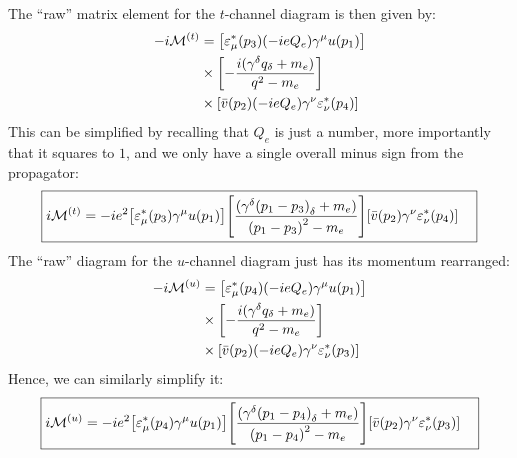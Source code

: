 \documentclass[12pt]{article}
\newcommand{\M}{\mathcal{M}}
\newcommand{\veps}{\varepsilon}
\begin{document}
The ``raw'' matrix element for the $t$-channel diagram is then given by:
\begin{align*}
  -i\M^{(t)}&=\qty[\veps^*_\mu(p_3)(-ieQ_e)\gamma^\mu u(p_1)]\\
  &\times\qty[-\frac{i(\gamma^\delta q_\delta+m_e)}{q^2-m_e}]\\
  &\times\qty[\bar{v}(p_2)(-ieQ_e)\gamma^\nu \veps^*_\nu(p_4)]
\end{align*}
This can be simplified by recalling that $Q_e$ is just a number, more importantly that it squares to $1$, and we only have a single overall minus sign from the propagator:
\begin{equation}
  \label{eq:p7a}
  \boxed{
    \begin{aligned}
      i\M^{(t)}&=-ie^2\qty[\veps^*_\mu(p_3)\gamma^\mu u(p_1)]
      \qty[\frac{(\gamma^\delta{(p_1-p_3)}_\delta+m_e)}{{(p_1-p_3)}^2-m_e}]
      \qty[\bar{v}(p_2)\gamma^\nu \veps^*_\nu(p_4)]
    \end{aligned}
  }
\end{equation}
The ``raw'' diagram for the $u$-channel diagram just has its momentum rearranged:
\begin{align*}
  -i\M^{(u)}&=\qty[\veps^*_\mu(p_4)(-ieQ_e)\gamma^\mu u(p_1)]\\
  &\times\qty[-\frac{i(\gamma^\delta q_\delta+m_e)}{q^2-m_e}]\\
  &\times\qty[\bar{v}(p_2)(-ieQ_e)\gamma^\nu \veps^*_\nu(p_3)]
\end{align*}
Hence, we can similarly simplify it:
\begin{equation}
  \label{eq:p7b}
  \boxed{
    \begin{aligned}
      i\M^{(u)}&=-ie^2\qty[\veps^*_\mu(p_4)\gamma^\mu u(p_1)]
      \qty[\frac{(\gamma^\delta{(p_1-p_4)}_\delta+m_e)}{{(p_1-p_4)}^2-m_e}]
      \qty[\bar{v}(p_2)\gamma^\nu \veps^*_\nu(p_3)]
    \end{aligned}
  }
\end{equation}
\newpage
\end{document}
